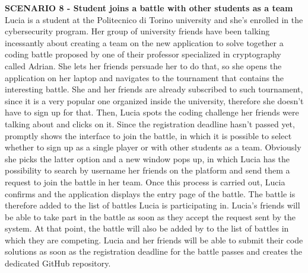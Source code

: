     \textbf{SCENARIO 8 - Student joins a battle with other students as a team}\\
    Lucia is a student at the Politecnico di Torino university and she's enrolled in the cybersecurity program. Her group of university friends have been talking incessantly about creating a team on the new \app application to solve together a coding battle proposed by one of their professor specialized in cryptography called Adrian. She lets her friends persuade her to do that, so she opens the \app application on her laptop and navigates to the tournament that contains the interesting battle. She and her friends are already subscribed to such tournament, since it is a very popular one organized inside the university, therefore she doesn't have to sign up for that. Then, Lucia spots the coding challenge her friends were talking about and clicks on it. Since the registration deadline hasn't passed yet, \app promptly shows the interface to join the battle, in which it is possible to select whether to sign up as a single player or with other students as a team. Obviously she picks the latter option and a new window pops up, in which Lucia has the possibility to search by username her friends on the platform and send them a request to join the battle in her team. Once this process is carried out, Lucia confirms and the \app application displays the entry page of the battle. The battle is therefore added to the list of battles Lucia is participating in.
    Lucia's friends will be able to take part in the battle as soon as they accept the request sent by the system. At that point, the battle will also be added by \app to the list of battles in which they are competing.
    Lucia and her friends will be able to submit their code solutions as soon as the registration deadline for the battle passes and \app creates the dedicated GitHub repository.\\
    
